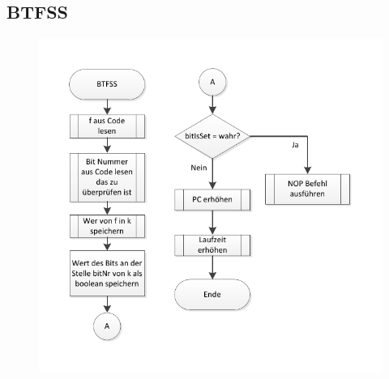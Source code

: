 \newpage
\subsection{BTFSS}



\begin{figure}[h]
\centering
\includegraphics[scale=0.7]{Diag/BTFSS.pdf}
\end{figure}
